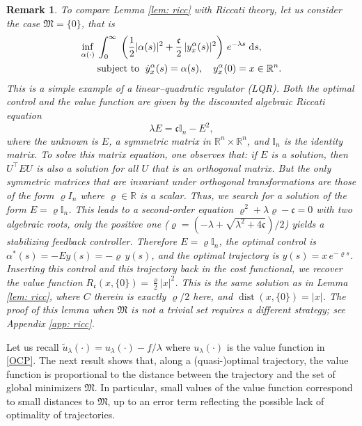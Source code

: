 \documentclass[12pt]{amsart}
\newcommand{\D}[1]{\mbox{\rm #1}}
\newcommand{\dd}{\D{d}}
\numberwithin{equation}{section}
\theoremstyle{plain}
\newtheorem{remark}[theorem]{Remark}
\begin{document}
\begin{remark}
To compare Lemma \ref{lem: ricc} with Riccati theory, let us consider the case $\mathfrak{M}=\{0\}$, that is
\begin{equation*}
\begin{aligned}
    \inf\limits_{\alpha(\cdot)} \; & \int_{0}^{\infty}\; \left(\frac{1}{2}|\alpha(s)|^{2} + \frac{\mathfrak{c}}{2}\,|y_{x}^{\alpha}(s)|^{2}\right)\, e^{-\lambda s}\;\dd s,\\
    & \text{subject  to  }\; \dot{y}_{x}^{\alpha}(s) = \alpha(s),\quad y_{x}^{\alpha}(0)=x\in\mathbb{R}^n.
\end{aligned}
\end{equation*}
This is a simple example of a linear–quadratic regulator (LQR). Both the optimal control and the value function are given by the discounted algebraic Riccati equation
\begin{equation*}
    \lambda E = \mathfrak{c}\mathbb{I}_{n} - E^{2},
\end{equation*}
where the unknown is $E$, a symmetric matrix in $\mathbb{R}^{n}\times\mathbb{R}^{n}$, and $\mathbb{I}_{n}$ is the identity matrix. To solve this matrix equation, one observes that: if $E$ is a solution, then $U^{\top}EU$ is also a solution for all $U$ that is an orthogonal matrix. But the only symmetric matrices that are invariant under orthogonal transformations are those of the form $\varrho I_{n}$ where $\varrho\in \mathbb{R}$ is a scalar. Thus, we search for a solution of the form $E=\varrho\mathbb{I}_{n}$. This leads to a second-order equation $\varrho^{2} + \lambda \varrho - \mathfrak{c} = 0$ with two algebraic roots, only the positive one ($\varrho = (-\lambda + \sqrt{\lambda^{2}+4\mathfrak{c}})/2$) yields a stabilizing feedback controller. Therefore $E = \varrho \mathbb{I}_{n}$, the optimal control is $\alpha^{*}(s) = -E y(s) = -\varrho \,y(s)$, and the optimal trajectory is $y(s) = x\,e^{-\varrho s}$. Inserting this control and this trajectory back in the cost functional, we recover the value function $R_{\mathfrak{c}}(x,\{0\}) = \frac{\varrho}{2} |x|^{2}$. This is the same solution as in Lemma \ref{lem: ricc}, where $C$ therein is exactly $\varrho/2$ here, and $\operatorname{dist}(x,\{0\}) = |x|$. The proof of this lemma when $\mathfrak{M}$ is not a trivial set requires a different strategy; see Appendix \ref{app: ricc}.
\end{remark}



Let us recall  $\tilde{u}_{\lambda}(\cdot) = u_{\lambda}(\cdot) - \underline{f}/\lambda$ where $u_{\lambda}(\cdot)$ is the value function in \eqref{OCP}. The next result shows that, along a (quasi-)optimal trajectory, the value function is proportional to the distance between the trajectory and the set of global minimizers $\mathfrak{M}$. In particular, small values of the value function correspond to small distances to $\mathfrak{M}$, up to an error term reflecting the possible lack of optimality of trajectories.
\end{document}
